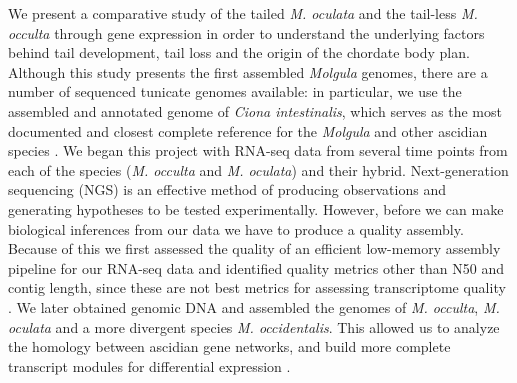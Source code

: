 We present a comparative study of the tailed \textit{M. oculata} and the tail-less \textit{M. occulta} through gene expression in order to understand the underlying factors behind tail development, tail loss and the origin of the chordate body plan. Although this study presents the first assembled \textit{Molgula} genomes, there are a number of sequenced tunicate genomes available: in particular, we use the assembled and annotated genome of \textit{Ciona intestinalis}, which serves as the most documented and closest complete reference for the \textit{Molgula} and other ascidian species \cite{dehal_draft_2002,satoh_ascidian_2003,satoh_ciona_2003}. We began this project with RNA-seq data from several time points from each of the species (\textit{M. occulta} and \textit{M. oculata}) and their hybrid. Next-generation sequencing (NGS) is an effective method of producing observations and generating hypotheses to be tested experimentally. However, before we can make biological inferences from our data we have to produce a quality assembly. Because of this we first assessed the quality of an efficient low-memory assembly pipeline for our RNA-seq data and identified quality metrics other than N50 and contig length, since these are not best metrics for assessing transcriptome quality \cite{oneil_assessing_2013}. We later obtained genomic DNA and assembled the genomes of \textit{M. occulta}, \textit{M. oculata} and a more divergent species \textit{M. occidentalis}. This allowed us to analyze the homology between ascidian gene networks, and build more complete transcript modules for differential expression \cite{vijay_challenges_2012}.

